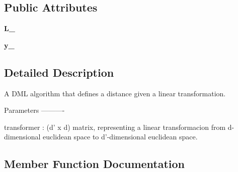 \subsection*{Public Attributes}
\begin{DoxyCompactItemize}
\item 
{\bfseries L\+\_\+}\hypertarget{classdml_1_1base_1_1Transformer_ae545c8d86053bddf2ed9c34308462406}{}\label{classdml_1_1base_1_1Transformer_ae545c8d86053bddf2ed9c34308462406}

\item 
{\bfseries y\+\_\+}\hypertarget{classdml_1_1base_1_1Transformer_ab3cf89b17477747577644c6ebf292569}{}\label{classdml_1_1base_1_1Transformer_ab3cf89b17477747577644c6ebf292569}

\end{DoxyCompactItemize}


\subsection{Detailed Description}
\begin{DoxyVerb}A DML algorithm that defines a distance given a linear transformation.

Parameters
----------

transformer : (d' x d) matrix, representing a linear transformacion from d-dimensional euclidean space
              to d'-dimensional euclidean space.
\end{DoxyVerb}
 

\subsection{Member Function Documentation}
